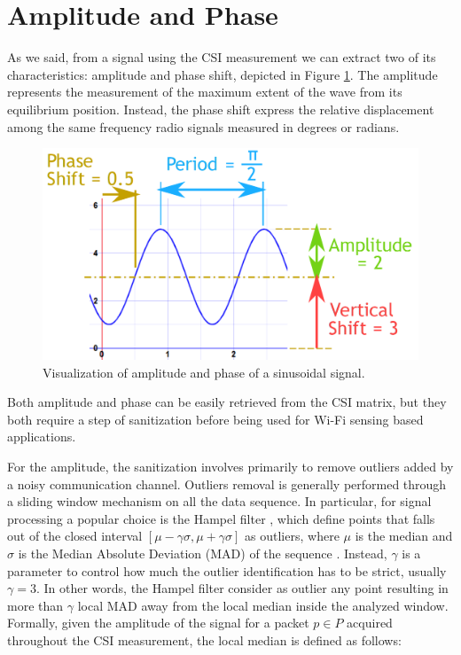 \documentclass[binding=0.6cm,noexaminfo]{sapthesis}
\begin{document}

\section{Amplitude and Phase}\label{sec:amp-pha}

As we said, from a signal using the CSI measurement we can extract two of its characteristics: amplitude and phase shift, depicted in Figure \ref{fig:amp-phase}. The amplitude represents the measurement of the maximum extent of the wave from its equilibrium position. Instead, the phase shift express the relative displacement among the same frequency radio signals measured in degrees or radians.

\begin{figure}[h!]
\centering
\includegraphics[width=.5\linewidth]{amplitude-phase}
\caption{Visualization of amplitude and phase of a sinusoidal signal.}
\label{fig:amp-phase}
\end{figure}

Both amplitude and phase can be easily retrieved from the CSI matrix, but they both require a step of sanitization before being used for Wi-Fi sensing based applications.

For the amplitude, the sanitization involves primarily to remove outliers added by a noisy communication channel. Outliers removal is generally performed through a sliding window mechanism on all the data sequence. In particular, for signal processing a popular choice is the Hampel filter \cite{hampel}, which define points that falls out of the closed interval $[\mu - \gamma \sigma, \mu + \gamma \sigma]$ as outliers, where $\mu$ is the median and $\sigma$ is the Median Absolute Deviation (MAD) of the sequence \cite{pads}. Instead, $\gamma$ is a parameter to control how much the outlier identification has to be strict, usually $\gamma = 3$. In other words, the Hampel filter consider as outlier any point resulting in more than $\gamma$ local MAD away from the local median inside the analyzed window.
Formally, given the amplitude of the signal for a packet $p \in P$ acquired throughout the CSI measurement, the local median is defined as follows:
\end{document}
